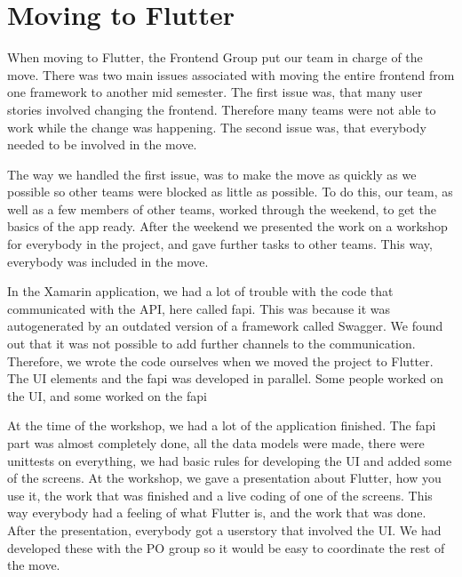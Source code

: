 \section{Moving to Flutter}
When moving to Flutter, the Frontend Group put our team in charge of the move. 
There was two main issues associated with moving the entire frontend from one framework to another mid semester.
The first issue was, that many user stories involved changing the frontend. Therefore many teams were not able to work while the change was happening.
The second issue was, that everybody needed to be involved in the move. 

The way we handled the first issue, was to make the move as quickly as we possible so other teams were blocked as little as possible.
To do this, our team, as well as a few members of other teams, worked through the weekend, to get the basics of the app ready. After the weekend we presented the work on a workshop for everybody in the project, and gave further tasks to other teams.
This way, everybody was included in the move. 

In the Xamarin application, we had a lot of trouble with the code that communicated with the API, here called \gls{fapi}. This was because it was autogenerated by an outdated version of a framework called Swagger. We found out that it was not possible to add further channels to the communication. Therefore, we wrote the code ourselves when we moved the project to Flutter. The UI elements and the \gls{fapi} was developed in parallel. Some people worked on the UI, and some worked on the \gls{fapi}

At the time of the workshop, we had a lot of the application finished. The \gls{fapi} part was almost completely done, all the data models were made, there were unittests on everything, we had basic rules for developing the UI and added some of the screens. 
At the workshop, we gave a presentation about Flutter, how you use it, the work that was finished and a live coding of one of the screens. This way everybody had a feeling of what Flutter is, and the work that was done. 
After the presentation, everybody got a userstory that involved the UI. We had developed these with the \gls{PO} group so it would be easy to coordinate the rest of the move.  
